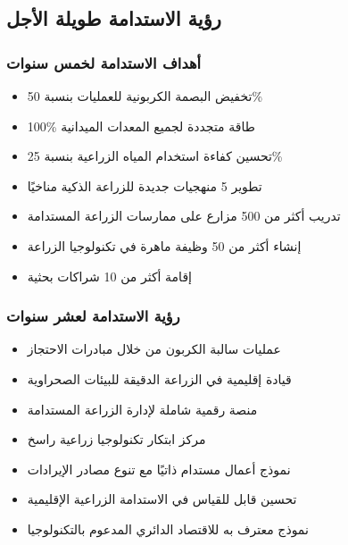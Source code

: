 \subsection{رؤية الاستدامة طويلة الأجل}

\subsubsection{أهداف الاستدامة لخمس سنوات}
\begin{itemize}
    \item تخفيض البصمة الكربونية للعمليات بنسبة 50\%
    \item 100\% طاقة متجددة لجميع المعدات الميدانية
    \item تحسين كفاءة استخدام المياه الزراعية بنسبة 25\%
    \item تطوير 5 منهجيات جديدة للزراعة الذكية مناخيًا
    \item تدريب أكثر من 500 مزارع على ممارسات الزراعة المستدامة
    \item إنشاء أكثر من 50 وظيفة ماهرة في تكنولوجيا الزراعة
    \item إقامة أكثر من 10 شراكات بحثية
\end{itemize}

\subsubsection{رؤية الاستدامة لعشر سنوات}
\begin{itemize}
    \item عمليات سالبة الكربون من خلال مبادرات الاحتجاز
    \item قيادة إقليمية في الزراعة الدقيقة للبيئات الصحراوية
    \item منصة رقمية شاملة لإدارة الزراعة المستدامة
    \item مركز ابتكار تكنولوجيا زراعية راسخ
    \item نموذج أعمال مستدام ذاتيًا مع تنوع مصادر الإيرادات
    \item تحسين قابل للقياس في الاستدامة الزراعية الإقليمية
    \item نموذج معترف به للاقتصاد الدائري المدعوم بالتكنولوجيا
\end{itemize} 